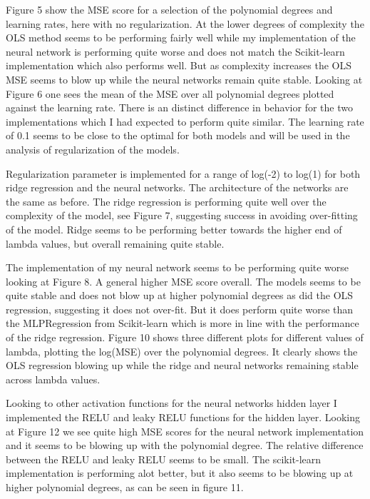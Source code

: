 \documentclass[reprint,english,notitlepage]{revtex4-2}  %
\begin{document}
Figure 5 show the MSE score for a selection of the polynomial degrees and learning rates, here with no regularization. At the lower degrees of complexity the OLS method seems to be performing fairly well while my implementation of the neural network is performing quite worse and does not match the Scikit-learn implementation which also performs well. But as complexity increases the OLS MSE seems to blow up while the neural networks remain quite stable. Looking at Figure 6 one sees the mean of the MSE over all polynomial degrees plotted against the learning rate. There is an distinct difference in behavior for the two implementations which I had expected to perform quite similar. The learning rate of 0.1  seems to be close to the optimal for both models and will be used in the analysis of regularization of the models. 

Regularization parameter is implemented for a range of log(-2) to log(1) for both ridge regression and the neural networks. The architecture of the networks are the same as before. The ridge regression is performing quite well over the complexity of the model, see Figure 7, suggesting success in avoiding over-fitting of the model. Ridge seems to be performing better towards the higher end of lambda values, but overall remaining quite stable. 

The implementation of my neural network seems to be performing quite worse looking at Figure 8. A general higher MSE score overall. The models seems to be quite stable and does not blow up at higher polynomial degrees as did the OLS regression, suggesting it does not over-fit. But it does perform quite worse than the MLPRegression from Scikit-learn which is more in line with the performance of the ridge regression. Figure 10 shows three different plots for different values of lambda, plotting the log(MSE) over the polynomial degrees. It clearly shows the OLS regression blowing up  while the ridge and neural networks remaining stable across lambda values. 

Looking to other activation functions for the neural networks hidden layer I implemented the RELU and leaky RELU functions for the hidden layer. Looking at Figure 12 we see quite high MSE scores for the neural network implementation and it seems to be blowing up with the polynomial degree. The relative difference between the RELU and leaky RELU seems to be small. The scikit-learn implementation is performing alot better, but it also seems to be blowing up at higher polynomial degrees, as can be seen in figure 11. 
\end{document}
